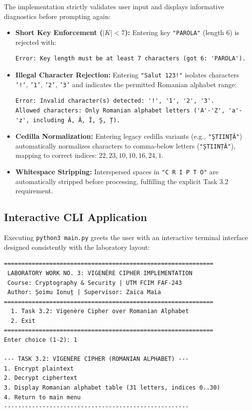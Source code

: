 \documentclass{labreport}
\begin{document}
The implementation strictly validates user input and displays informative diagnostics before prompting again:
\begin{itemize}[noitemsep, topsep=2pt]
    \item \textbf{Short Key Enforcement ($|K| < 7$):} Entering key \texttt{"PAROLA"} (length 6) is rejected with:
\begin{lstlisting}[style=bash]
Error: Key length must be at least 7 characters (got 6: 'PAROLA').
\end{lstlisting}
    \item \textbf{Illegal Character Rejection:} Entering \texttt{"Salut 123!"} isolates characters \texttt{'!'}, \texttt{'1'}, \texttt{'2'}, \texttt{'3'} and indicates the permitted Romanian alphabet range:
\begin{lstlisting}[style=bash]
Error: Invalid character(s) detected: '!', '1', '2', '3'.
Allowed characters: Only Romanian alphabet letters ('A'-'Z', 'a'-'z', including Ă, Â, Î, Ș, Ț).
\end{lstlisting}
    \item \textbf{Cedilla Normalization:} Entering legacy cedilla variants (e.g., \texttt{"\c{S}TIIN\c{T}\u{A}"}) automatically normalizes characters to comma-below letters (\texttt{"ȘTIINȚĂ"}), mapping to correct indices: $22, 23, 10, 10, 16, 24, 1$.
    \item \textbf{Whitespace Stripping:} Interspersed spaces in \texttt{"C R I P T O"} are automatically stripped before processing, fulfilling the explicit Task 3.2 requirement.
\end{itemize}

\subsection{Interactive CLI Application}

Executing \texttt{python3 main.py} greets the user with an interactive terminal interface designed consistently with the laboratory layout:

\begin{lstlisting}[style=bash]
============================================================
 LABORATORY WORK NO. 3: VIGENÈRE CIPHER IMPLEMENTATION 
 Course: Cryptography & Security | UTM FCIM FAF-243 
 Author: Șoimu Ionuț | Supervisor: Zaica Maia 
============================================================
  1. Task 3.2: Vigenère Cipher over Romanian Alphabet
  2. Exit
============================================================
Enter choice (1-2): 1

--- TASK 3.2: VIGENÈRE CIPHER (ROMANIAN ALPHABET) ---
1. Encrypt plaintext
2. Decrypt ciphertext
3. Display Romanian alphabet table (31 letters, indices 0..30)
4. Return to main menu
-----------------------------------------------------
\end{lstlisting}
\end{document}
